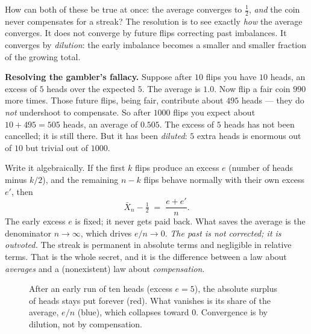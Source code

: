 How can both of these be true at once: the average converges to $\tfrac12$, \emph{and} the coin never compensates for a streak? The resolution is to see exactly \emph{how} the average converges. It does not converge by future flips correcting past imbalances. It converges by \emph{dilution}: the early imbalance becomes a smaller and smaller fraction of the growing total.

\begin{paradoxbox}
\textbf{Resolving the gambler's fallacy.} Suppose after $10$ flips you have $10$ heads, an excess of $5$ heads over the expected $5$. The average is $1.0$. Now flip a fair coin $990$ more times. Those future flips, being fair, contribute about $495$ heads --- they do \emph{not} undershoot to compensate. So after $1000$ flips you expect about $10 + 495 = 505$ heads, an average of $0.505$. The excess of $5$ heads has not been cancelled; it is still there. But it has been \emph{diluted}: $5$ extra heads is enormous out of $10$ but trivial out of $1000$.

Write it algebraically. If the first $k$ flips produce an excess $e$ (number of heads minus $k/2$), and the remaining $n-k$ flips behave normally with their own excess $e'$, then
\[
  \bar X_n - \tfrac12 \;=\; \frac{e + e'}{n}.
\]
The early excess $e$ is fixed; it never gets paid back. What saves the average is the denominator $n \to \infty$, which drives $e/n \to 0$. \emph{The past is not corrected; it is outvoted.} The streak is permanent in absolute terms and negligible in relative terms. That is the whole secret, and it is the difference between a law about \emph{averages} and a (nonexistent) law about \emph{compensation}.
\end{paradoxbox}

\begin{figure}[H]
\centering
{}
\caption{After an early run of ten heads (excess $e=5$), the absolute surplus of heads stays put forever (red). What vanishes is its share of the average, $e/n$ (blue), which collapses toward $0$. Convergence is by dilution, not by compensation.}
\label{ch20:fig-dilution}
\end{figure}

